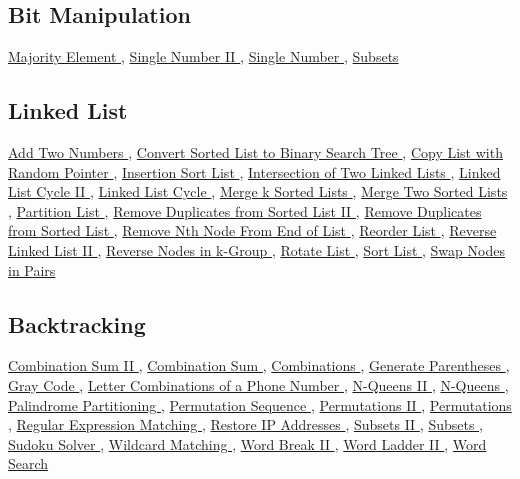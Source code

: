 \documentclass{article}
\begin{document}
\begin{CJK*}{UTF8}{gkai}
\subsection*{ Bit Manipulation }
\label{ Bit Manipulation }
\hyperref[ Majority Element ]{ Majority Element },
\hyperref[ Single Number II ]{ Single Number II },
\hyperref[ Single Number ]{ Single Number },
\hyperref[ Subsets ]{ Subsets }

\subsection*{ Linked List }
\label{ Linked List }
\hyperref[ Add Two Numbers ]{ Add Two Numbers },
\hyperref[ Convert Sorted List to Binary Search Tree ]{ Convert Sorted List to Binary Search Tree },
\hyperref[ Copy List with Random Pointer ]{ Copy List with Random Pointer },
\hyperref[ Insertion Sort List ]{ Insertion Sort List },
\hyperref[ Intersection of Two Linked Lists ]{ Intersection of Two Linked Lists },
\hyperref[ Linked List Cycle II ]{ Linked List Cycle II },
\hyperref[ Linked List Cycle ]{ Linked List Cycle },
\hyperref[ Merge k Sorted Lists ]{ Merge k Sorted Lists },
\hyperref[ Merge Two Sorted Lists ]{ Merge Two Sorted Lists },
\hyperref[ Partition List ]{ Partition List },
\hyperref[ Remove Duplicates from Sorted List II ]{ Remove Duplicates from Sorted List II },
\hyperref[ Remove Duplicates from Sorted List ]{ Remove Duplicates from Sorted List },
\hyperref[ Remove Nth Node From End of List ]{ Remove Nth Node From End of List },
\hyperref[ Reorder List ]{ Reorder List },
\hyperref[ Reverse Linked List II ]{ Reverse Linked List II },
\hyperref[ Reverse Nodes in k-Group ]{ Reverse Nodes in k-Group },
\hyperref[ Rotate List ]{ Rotate List },
\hyperref[ Sort List ]{ Sort List },
\hyperref[ Swap Nodes in Pairs ]{ Swap Nodes in Pairs }

\subsection*{ Backtracking }
\label{ Backtracking }
\hyperref[ Combination Sum II ]{ Combination Sum II },
\hyperref[ Combination Sum ]{ Combination Sum },
\hyperref[ Combinations ]{ Combinations },
\hyperref[ Generate Parentheses ]{ Generate Parentheses },
\hyperref[ Gray Code ]{ Gray Code },
\hyperref[ Letter Combinations of a Phone Number ]{ Letter Combinations of a Phone Number },
\hyperref[ N-Queens II ]{ N-Queens II },
\hyperref[ N-Queens ]{ N-Queens },
\hyperref[ Palindrome Partitioning ]{ Palindrome Partitioning },
\hyperref[ Permutation Sequence ]{ Permutation Sequence },
\hyperref[ Permutations II ]{ Permutations II },
\hyperref[ Permutations ]{ Permutations },
\hyperref[ Regular Expression Matching ]{ Regular Expression Matching },
\hyperref[ Restore IP Addresses ]{ Restore IP Addresses },
\hyperref[ Subsets II ]{ Subsets II },
\hyperref[ Subsets ]{ Subsets },
\hyperref[ Sudoku Solver ]{ Sudoku Solver },
\hyperref[ Wildcard Matching ]{ Wildcard Matching },
\hyperref[ Word Break II ]{ Word Break II },
\hyperref[ Word Ladder II ]{ Word Ladder II },
\hyperref[ Word Search ]{ Word Search }


\end{CJK*}
\end{document}
